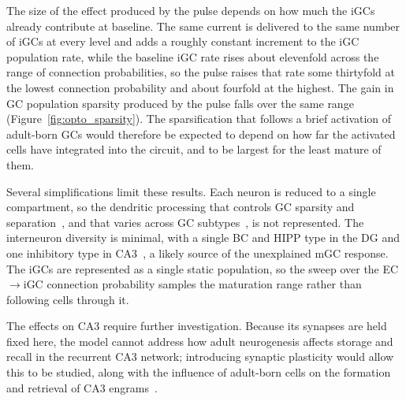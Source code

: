 The size of the effect produced by the pulse depends on how much the iGCs already contribute at baseline. The same current is
delivered to the same number of iGCs at every level and adds a roughly constant increment to the iGC population rate, while the
baseline iGC rate rises about elevenfold across the range of connection probabilities, so the pulse raises that rate some
thirtyfold at the lowest connection probability and about fourfold at the highest. The gain in GC population sparsity produced by
the pulse falls over the same range (Figure~\ref{fig:opto_sparsity}). The sparsification that follows a brief activation of
adult-born GCs would therefore be expected to depend on how far the activated cells have integrated into the circuit, and to be
largest for the least mature of them.

Several simplifications limit these results. Each neuron is reduced to a single compartment, so the dendritic processing that
controls GC sparsity and separation~\parencite{chavlisDendrites2017}, and that varies across GC
subtypes~\parencite{maoExcitatory2025}, is not represented. The interneuron diversity is minimal, with a single BC and HIPP type
in the DG and one inhibitory type in CA3~\parencite{kopsickFormation2024}, a likely source of the unexplained mGC response. The
iGCs are represented as a single static population, so the sweep over the EC$\to$iGC connection probability samples the maturation
range rather than following cells through it.

The effects on CA3 require further investigation. Because its synapses are held fixed here, the model cannot address how adult
neurogenesis affects storage and recall in the recurrent CA3 network; introducing synaptic plasticity would allow this to be
studied, along with the influence of adult-born cells on the formation and retrieval of CA3 engrams~\parencite{rollsMechanisms2013,
kopsickFormation2024, koSystems2025}.
